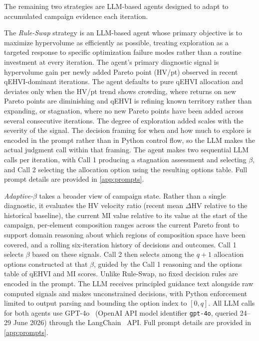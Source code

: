 The remaining two strategies are LLM-based agents designed to adapt to accumulated campaign evidence each iteration.

The \textit{Rule-Swap} strategy is an LLM-based agent whose primary objective is to maximize hypervolume as efficiently as possible, treating exploration as a targeted response to specific optimization failure modes rather than a routine investment at every iteration. The agent's primary diagnostic signal is hypervolume gain per newly added Pareto point (HV/pt) observed in recent qEHVI-dominant iterations. The agent defaults to pure qEHVI allocation and deviates only when the HV/pt trend shows crowding, where returns on new Pareto points are diminishing and qEHVI is refining known territory rather than expanding, or stagnation, where no new Pareto points have been added across several consecutive iterations. The degree of exploration added scales with the severity of the signal. The decision framing for when and how much to explore is encoded in the prompt rather than in Python control flow, so the LLM makes the actual judgment call within that framing. The agent makes two sequential LLM calls per iteration, with Call 1 producing a stagnation assessment and selecting $\beta$, and Call 2 selecting the allocation option using the resulting options table. Full prompt details are provided in \ref{app:prompts}.

\textit{Adaptive-$\beta$} takes a broader view of campaign state. Rather than a single diagnostic, it evaluates the HV velocity ratio (recent mean $\Delta$HV relative to the historical baseline), the current MI value relative to its value at the start of the campaign, per-element composition ranges across the current Pareto front to support domain reasoning about which regions of composition space have been covered, and a rolling six-iteration history of decisions and outcomes. Call 1 selects $\beta$ based on these signals. Call 2 then selects among the $q+1$ allocation options constructed at that $\beta$, guided by the Call 1 reasoning and the options table of qEHVI and MI scores. Unlike Rule-Swap, no fixed decision rules are encoded in the prompt. The LLM receives principled guidance text alongside raw computed signals and makes unconstrained decisions, with Python enforcement limited to output parsing and bounding the option index to $[0,q]$. All LLM calls for both agents use GPT-4o~\citep{OpenAI2024} (OpenAI API model identifier \texttt{gpt-4o}, queried 24--29 June 2026) through the LangChain~\citep{Chase2022} API. Full prompt details are provided in \ref{app:prompts}.

